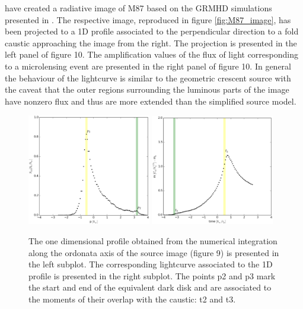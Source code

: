 \citep{2012MNRAS.421.1517D} have created a radiative image of M87 based on the GRMHD simulations presented in \citep{2009MNRAS.394L.126M}. The respective image, reproduced in figure \ref{fig:M87_image}, has been projected to a 1D profile associated to the perpendicular direction to a fold caustic approaching the image from the right. The projection is presented in the left panel of figure 10. The amplification values of the flux of light corresponding to a microlensing event are presented in the right panel of figure 10. In general the behaviour of the lightcurve is similar to the geometric crescent source with the caveat that the outer regions surrounding the luminous parts of the image have nonzero flux and thus are more extended than the simplified source model.

\begin{figure}
\centering
	\includegraphics[width = 0.48\textwidth]{plots/M87_shape.eps}
        \includegraphics[width = 0.48\textwidth]{plots/M87_lc.eps}
\caption{\label{fig:M87_plots} The one dimensional profile obtained from the numerical integration along the ordonata axis of the source image (figure 9) is presented in the left subplot. The corresponding lightcurve associated to the 1D profile is presented in the right subplot. The points p2 and p3 mark the start and end of the equivalent dark disk and are associated to the moments of their overlap with the caustic: t2 and t3.}
\end{figure}





